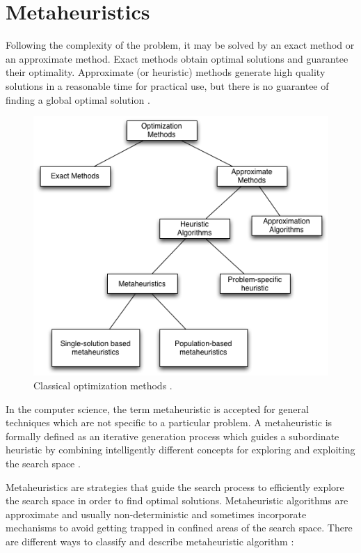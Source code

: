 \chapter{Metaheuristics}


Following the complexity of the problem, it may be solved by an exact method or an
approximate method. Exact methods obtain optimal solutions and guarantee
their optimality. Approximate (or heuristic) methods generate high quality
solutions in a reasonable time for practical use, but there is no guarantee of finding a global optimal solution \cite{Talbi2013}.


\begin{figure}[h]
\centering
\includegraphics[width=1\textwidth]{./images/optimization.png}
\caption{Classical optimization methods \cite{Talbi2013}. }
\label{fig:optimization}
\end{figure}


In the computer science, the term metaheuristic is accepted for general techniques which are not specific to a particular problem. A metaheuristic is formally defined as an iterative generation process which guides a subordinate heuristic by combining intelligently different concepts for exploring and exploiting the search space \cite{raidl2010metaheuristic}. 

Metaheuristics are strategies that guide the search process to efficiently explore the search space in order to find optimal solutions. Metaheuristic algorithms are approximate and usually non-deterministic and sometimes incorporate mechanisms to avoid getting trapped in confined areas of the search space. There are different ways to classify and describe metaheuristic algorithm \cite{Blum2003}:

